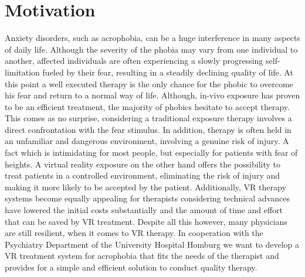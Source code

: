 


\section{Motivation}
Anxiety disorders, such as acrophobia, can be a huge interference in many aspects of daily life. Although the severity of the phobia may vary from one individual to another, affected individuals are often experiencing a slowly progressing self-limitation fueled by their fear, resulting in a steadily declining quality of life. At this point a well executed therapy is the only chance for the phobic to overcome his fear and return to a normal way of life. Although, in-vivo exposure has proven to be an efficient treatment, the majority of phobics hesitate to accept therapy. This comes as no surprise, considering a traditional exposure therapy involves a direct confrontation with the fear stimulus. In addition, therapy is often held in an unfamiliar and dangerous environment, involving a genuine risk of injury. A fact which is intimidating for most people, but especially for patients with fear of heights. A virtual reality exposure on the other hand offers the possibility to treat patients in a controlled environment, eliminating the risk of injury and making it more likely to be accepted by the patient. Additionally, VR therapy systems become equally appealing for therapists considering technical advances have lowered the initial costs substantially and the amount of time and effort that can be saved by VR treatment.
Despite all this however, many physicians are still resilient, when it comes to VR therapy.
In cooperation with the Psychiatry Department of the University Hospital Homburg we want to develop a VR treatment system for acrophobia that fits the needs of the therapist and provides for a simple and efficient solution to conduct quality therapy.





